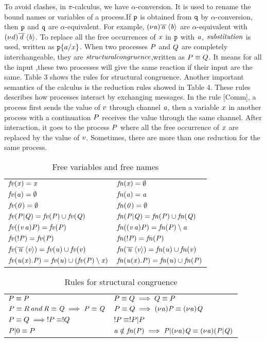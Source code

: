 \documentclass[a4paper]{article}
\newcommand{\newa}{\nu}
\begin{document}
To avoid clashes, in \(\pi\)-calculus, we have $\alpha$-conversion. It is used to rename the bound names or variables of a process.If $\p$ is obtained from $\q$ by $\alpha$-conversion, then $\p$ and $\q$ are $\alpha$-equivalent. For example, $\it (\newa a)\bar{a}\left\langle b \right\rangle$ are $\alpha$-equivalent with $\it (\newa d)\bar{d}\left\langle b \right\rangle$. To replace all the free occurrences of $\it x$ in $\p$ with $\it a$, $\it substitution$ is used, written as $\p \sub{a}{x}$. When two processes  $\PP$ and  $\Q$ are completely interchangeable, they are $\it structural congruence$,written as $\PP\equiv\Q$. It means for all the input ,these two processes  will give  the same reaction if their input are the same. Table 3 shows the rules for structural congruence.
Another important semantics of the calculus is the reduction rules showed in Table 4. These rules describes how processes interact by exchanging messages. In the rule [Comm], a process first sends the value of  $\va$ through channel $\it a$, then a variable $\x$ in another process with a continuation $\PP$ receives the value through the same channel. After interaction, it goes to the process $\PP$ where all the free occurrence of $\x$ are replaced by the value of $\va$. Sometimes, there are more than one reduction for the same process.

\begin{table}
\centering
\begin{tabular}{ll}
$\it fv(x) = {x}$&$\it fn(x) = \emptyset $\\
$\it fv(a) = \emptyset$&$\it fn(a) = a$ \\
$\it fv(0) = \emptyset$&$\it fn(0) = \emptyset$ \\
$\it fv(P|Q) = fv(P)\cup fv(Q) $&$\it fn(P|Q) = fn(P)\cup fn(Q)$  \\
$\it fv((v\,a)P) = fv(P)$&$\it fn((v\,a)P) = fn(P)\setminus a $\\
$\it fv(!P) = fv(P)$&$\it fn(!P) = fn(P)$ \\
$\it fv(\bar{u}\left\langle v \right\rangle) = fv(u)\cup fv(v) $&$\it fn(\bar{u}\left\langle v \right\rangle) = fn(u)\cup fn(v)$  \\
$\it fv(u(x).P) = fv(u)\cup (fv(P)\setminus x)$ & $\it fn(u(x).P) = fn(u) \cup fn(P)$\\
\end{tabular}
\caption{Free variables and free names}
\end{table}

\begin{table}
\centering
\begin{tabular}{ll}
$\PP \equiv \PP$ & $\PP \equiv\Q\implies\Q\equiv\PP$\\
$\PP \equiv\R \it \,and\, \R\equiv\Q\implies\PP\equiv\Q$&$\PP\equiv\Q\implies\it (\newa a)\PP\equiv(\newa a)\Q$\\
$\PP\equiv\Q\implies!\PP\equiv!\Q$&$!\PP\equiv!\PP|\PP$\\
$\PP|0\equiv\PP$&$\it a \notin fn(\PP) \implies \PP|(\newa a)\Q \equiv (\newa a)(\PP|\Q)$\\
\end{tabular}
\caption{Rules for structural congruence}
\end{table}
\end{document}
